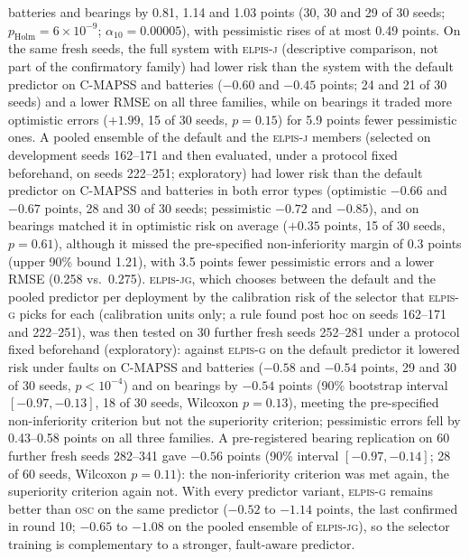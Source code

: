 \documentclass{esannV2}
\newcommand{\OSC}{\textsc{osc}}
\newcommand{\AUTOD}{\textsc{elpis-g}}
\newcommand{\EJ}{\textsc{elpis-j}}
\newcommand{\EJG}{\textsc{elpis-jg}}
\begin{document}
\begin{itemize}
batteries and bearings by 0.81, 1.14 and 1.03 points (30, 30 and 29 of 30 seeds; $p_{\text{Holm}}=6\times10^{-9}$; $\alpha_{10}=0.00005$), with pessimistic rises of at most 0.49 points. On the same fresh seeds, the full system with \EJ{} (descriptive comparison, not part of the confirmatory family) had lower risk than the system with the default predictor on C-MAPSS and batteries ($-0.60$ and $-0.45$ points; 24 and 21 of 30 seeds) and a lower RMSE on all three families, while on bearings it traded more optimistic errors ($+1.99$, 15 of 30 seeds, $p=0.15$) for 5.9 points fewer pessimistic ones. A pooled ensemble of the default and the \EJ{} members (selected on development seeds 162--171 and then evaluated, under a protocol fixed beforehand, on seeds 222--251; exploratory) had lower risk than the default predictor on C-MAPSS and batteries in both error types (optimistic $-0.66$ and $-0.67$ points, 28 and 30 of 30 seeds; pessimistic $-0.72$ and $-0.85$), and on bearings matched it in optimistic risk on average ($+0.35$ points, 15 of 30 seeds, $p=0.61$), although it missed the pre-specified non-inferiority margin of 0.3 points (upper 90\% bound 1.21), with 3.5 points fewer pessimistic errors and a lower RMSE (0.258 vs.\ 0.275). \EJG{}, which chooses between the default and the pooled predictor per deployment by the calibration risk of the selector that \AUTOD{} picks for each (calibration units only; a rule found post hoc on seeds 162--171 and 222--251), was then tested on 30 further fresh seeds 252--281 under a protocol fixed beforehand (exploratory): against \AUTOD{} on the default predictor it lowered risk under faults on C-MAPSS and batteries ($-0.58$ and $-0.54$ points, 29 and 30 of 30 seeds, $p<10^{-4}$) and on bearings by $-0.54$ points (90\% bootstrap interval $[-0.97,-0.13]$, 18 of 30 seeds, Wilcoxon $p=0.13$), meeting the pre-specified non-inferiority criterion but not the superiority criterion; pessimistic errors fell by 0.43--0.58 points on all three families. A pre-registered bearing replication on 60 further fresh seeds 282--341 gave $-0.56$ points (90\% interval $[-0.97,-0.14]$; 28 of 60 seeds, Wilcoxon $p=0.11$): the non-inferiority criterion was met again, the superiority criterion again not. With every predictor variant, \AUTOD{} remains better than \OSC{} on the same predictor ($-0.52$ to $-1.14$ points, the last confirmed in round 10; $-0.65$ to $-1.08$ on the pooled ensemble of \EJG), so the selector training is complementary to a stronger, fault-aware predictor.
\end{itemize}
\end{document}

